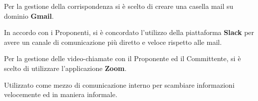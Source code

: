 				Per la gestione della corrispondenza si è scelto di creare una casella mail su dominio \textbf{Gmail}.
				
				In accordo con i Proponenti, si è concordato l'utilizzo della piattaforma \textbf{Slack} per avere un canale di comunicazione più diretto e veloce rispetto alle mail.
			
				Per la gestione delle video-chiamate con il Proponente ed il Committente, si è scelto di utilizzare l'applicazione \textbf{Zoom}.
				
				Utilizzato come mezzo di comunicazione interno per scambiare informazioni velocemente ed in maniera informale.
	